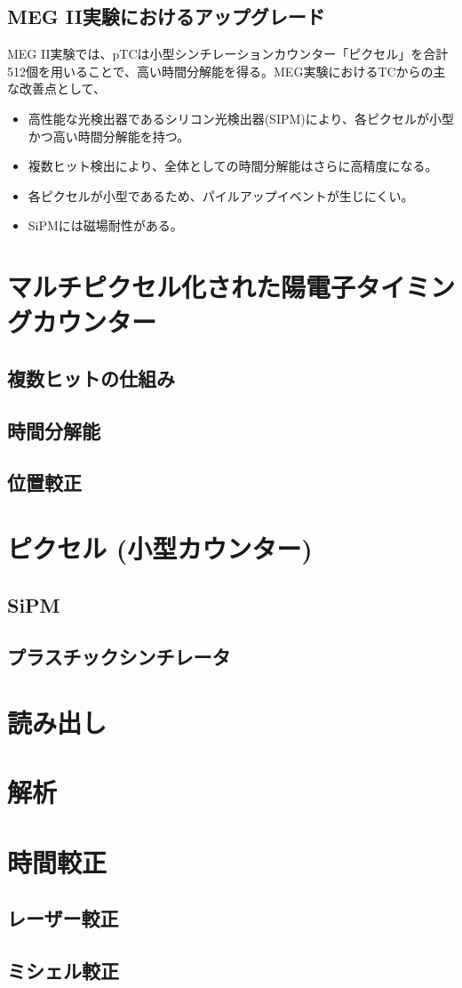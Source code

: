 \documentclass[Yonemoto_master.tex]{subfiles}
\begin{document}
\subsection{MEG II実験におけるアップグレード}
MEG II実験では、pTCは小型シンチレーションカウンター「ピクセル」を合計512個を用いることで、高い時間分解能を得る。MEG実験におけるTCからの主な改善点として、
\begin{itemize}
\item 高性能な光検出器であるシリコン光検出器(SIPM)により、各ピクセルが小型かつ高い時間分解能を持つ。
\item 複数ヒット検出により、全体としての時間分解能はさらに高精度になる。
\item 各ピクセルが小型であるため、パイルアップイベントが生じにくい。
\item SiPMには磁場耐性がある。
\end{itemize}

\section{マルチピクセル化された陽電子タイミングカウンター}
\subsection{複数ヒットの仕組み}
\subsection{時間分解能}
\subsection{位置較正}
\section{ピクセル (小型カウンター)}
\subsection{SiPM}
\subsection{プラスチックシンチレータ}
\section{読み出し}
\section{解析}

\section{時間較正}
\subsection{レーザー較正}
\subsection{ミシェル較正}

{ }{
\begin{thebibliography}{99}
\bibitem{}
\end{thebibliography}
}
\end{document}
